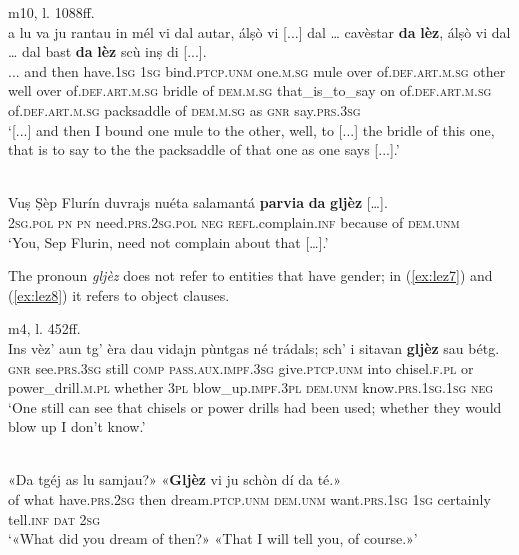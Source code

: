 \ea\label{ex:lez5}
 {m10, l. 1088ff.}\\
\gll  [...] a lu va ju rantau in mél vi dal autar,  álṣò vi [...] dal … cavèstar \textbf{da} \textbf{lèz}, álṣò vi dal … dal bast \textbf{da} \textbf{lèz} scù inṣ di [...].  \\
{...} and then have.\textsc{1sg} \textsc{1sg} bind.\textsc{ptcp.unm} one.\textsc{m.sg} mule over of.\textsc{def.art.m.sg} other well over {} of.\textsc{def.art.m.sg} {} bridle of \textsc{dem.m.sg} that\_is\_to\_say on of.\textsc{def.art.m.sg} {} of.\textsc{def.art.m.sg} packsaddle of \textsc{dem.m.sg} as \textsc{gnr}  say.\textsc{prs.3sg} \\
\glt `[...] and then I bound one mule to the other, well, to [...] the bridle of this one, that is to say to the the packsaddle of that one as one says [...].'
\z

\ea
\label{ex:lez6}
\\
\gll Vuṣ Ṣèp Flurín duvrajs nuéta salamantá \textbf{parvia} \textbf{da} \textbf{gljèz} […].\\
\textsc{2sg.pol} \textsc{pn} \textsc{pn} need.\textsc{prs.2sg.pol} \textsc{neg} \textsc{refl.}complain.\textsc{inf} because of \textsc{dem.unm} \\
\glt `You, Sep Flurin, need not complain about that […].'
\z

The pronoun \textit{gljèz} does not refer to entities that have gender; in (\ref{ex:lez7}) and (\ref{ex:lez8}) it refers to object clauses.


\ea
\label{ex:lez7}
 {m4, l. 452ff.}\\
\gll Ins vèz’ aun tg’ èra dau vidajn pùntgas né trádals; sch’ i sitavan \textbf{gljèz} sau bétg.\\
\textsc{gnr} see.\textsc{prs.3sg} still \textsc{comp} \textsc{pass.aux.impf.3sg} give.\textsc{ptcp.unm} into chisel.\textsc{f.pl} or power\_drill.\textsc{m.pl} whether \textsc{3pl} blow\_up.\textsc{impf.3pl} \textsc{dem.unm} know.\textsc{prs.1sg.1sg} \textsc{neg}\\
\glt `One still can see that chisels or power drills had been used; whether they would blow up I don’t know.'
\z

\ea
\label{ex:lez8}
\\
\gll «Da tgéj as lu samjau?» «\textbf{Gljèz} vi ju schòn dí da té.»\\
     of what have.\textsc{prs.2sg} then dream.\textsc{ptcp.unm} \textsc{dem.unm} want.\textsc{prs.1sg} \textsc{1sg} 
 certainly tell.\textsc{inf} \textsc{dat} \textsc{2sg}\\
\glt `«What did you dream of then?» «That I will tell you, of course.»'
\z

